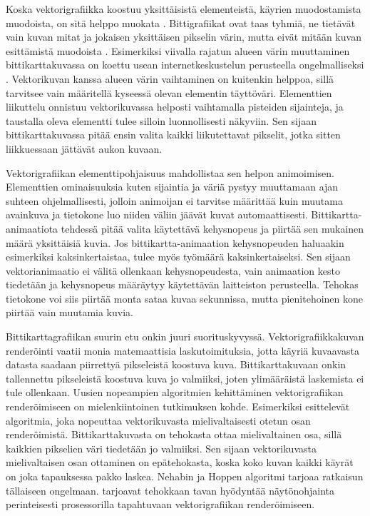 \documentclass[utf8,bachelor]{gradu3}
\begin{document}
Koska vektorigrafiikka koostuu yksittäisistä elementeistä, käyrien muodostamista muodoista, on sitä helppo muokata \parencite{RefWorks:doc:5bdc5224e4b05afcfde5b159}. Bittigrafiikat ovat taas tyhmiä, ne tietävät vain kuvan mitat ja jokaisen yksittäisen pikselin värin, mutta eivät mitään kuvan esittämistä muodoista \parencite{RefWorks:doc:5bdc5292e4b05afcfde5b171}. Esimerkiksi viivalla rajatun alueen värin muuttaminen bittikarttakuvassa on koettu usean internetkeskustelun perusteella ongelmalliseksi \parencites{RefWorks:doc:5bdf1069e4b0a1f99c63c515}{RefWorks:doc:5bdf10ece4b0273295d72f8a}{RefWorks:doc:5bdf119fe4b0b329c55e47c9}. Vektorikuvan kanssa alueen värin vaihtaminen on kuitenkin helppoa, sillä tarvitsee vain määritellä kyseessä olevan elementin täyttöväri. Elementtien liikuttelu onnistuu vektorikuvassa helposti vaihtamalla pisteiden sijainteja, ja taustalla oleva elementti tulee silloin luonnollisesti näkyviin. Sen sijaan bittikarttakuvassa pitää ensin valita kaikki liikutettavat pikselit, jotka sitten liikkuessaan jättävät aukon kuvaan. \parencite{RefWorks:doc:5bdc5224e4b05afcfde5b159}

Vektorigrafiikan elementtipohjaisuus mahdollistaa sen helpon animoimisen. Elementtien ominaisuuksia kuten sijaintia ja väriä pystyy muuttamaan ajan suhteen ohjelmallisesti, jolloin animoijan ei tarvitse määrittää kuin muutama avainkuva ja tietokone luo niiden väliin jäävät kuvat automaattisesti. Bittikartta-animaatiota tehdessä pitää valita käytettävä kehysnopeus ja piirtää sen mukainen määrä yksittäisiä kuvia. \parencite{RefWorks:doc:5bdc5224e4b05afcfde5b159} Jos bittikartta-animaation kehysnopeuden haluaakin esimerkiksi kaksinkertaistaa, tulee myös työmäärä kaksinkertaiseksi. Sen sijaan vektorianimaatio ei välitä ollenkaan kehysnopeudesta, vain animaation kesto tiedetään ja kehysnopeus määräytyy käytettävän laitteiston perusteella. Tehokas tietokone voi siis piirtää monta sataa kuvaa sekunnissa, mutta pienitehoinen kone piirtää vain muutamia kuvia.

Bittikarttagrafiikan suurin etu onkin juuri suorituskyvyssä. Vektorigrafiikkakuvan renderöinti vaatii monia matemaattisia laskutoimituksia, jotta käyriä kuvaavasta datasta saadaan piirrettyä pikseleistä koostuva kuva. Bittikarttakuvaan onkin tallennettu pikseleistä koostuva kuva jo valmiiksi, joten ylimääräistä laskemista ei tule ollenkaan. \parencite{RefWorks:doc:5bdc5292e4b05afcfde5b171} Uusien nopeampien algoritmien kehittäminen vektorigrafiikan renderöimiseen on mielenkiintoinen tutkimuksen kohde. Esimerkiksi \textcite{RefWorks:doc:5bdf538de4b04939ba18218f} esittelevät algoritmia, joka nopeuttaa vektorikuvasta mielivaltaisesti otetun osan renderöimistä. Bittikarttakuvasta on tehokasta ottaa mielivaltainen osa, sillä kaikkien pikselien väri tiedetään jo valmiiksi. Sen sijaan vektorikuvasta mielivaltaisen osan ottaminen on epätehokasta, koska koko kuvan kaikki käyrät on joka tapauksessa pakko laskea. Nehabin ja Hoppen algoritmi tarjoaa ratkaisun tällaiseen ongelmaan. \parencite{RefWorks:doc:5bdf538de4b04939ba18218f} \textcite{RefWorks:doc:5bc4a5cce4b080e02f7eff1b} tarjoavat tehokkaan tavan hyödyntää näytönohjainta perinteisesti prosessorilla tapahtuvaan vektorigrafiikan renderöimiseen.
\end{document}

